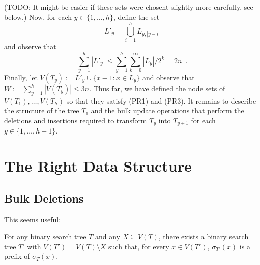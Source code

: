 \documentclass[kpfonts]{patmorin}
\begin{document}
(TODO: It might be easier if these sets were chosent slightly more carefully, see below.)
Now, for each $y\in\{1,\ldots,h\}$, define the set 
\[    L'_y = \bigcup_{i=1}^h L_{y,|y-i|} \]
and observe that
\[
   \sum_{y=1}^h |L'_y| \le \sum_{y=1}^h \sum_{k=0}^{\infty}|L_y|/2^k = 2n \enspace .
\]
Finally, let $V(T_y):= L'_y\cup \{x-1: x\in L_y\}$ and observe that $W:=\sum_{y=1}^h |V(T_y)| \le 3n$.  Thus far, we have defined the node sets of $V(T_1),\ldots,V(T_h)$ so that they satisfy (PR1) and (PR3).  It remains to describe the structure of the tree $T_1$ and the bulk update operations that perform the deletions and insertions required to transform $T_y$ into $T_{y+1}$ for each $y\in\{1,\ldots,h-1\}$.

\section{The Right Data Structure}


\subsection{Bulk Deletions}

This seems useful:

\begin{lem}
  For any binary search tree $T$ and any $X\subseteq V(T)$, there exists a binary search tree $T'$ with $V(T')=V(T)\setminus X$ such that, for every $x\in V(T')$, $\sigma_{T'}(x)$ is a prefix of $\sigma_{T}(x)$.
\end{lem}
\end{document}
